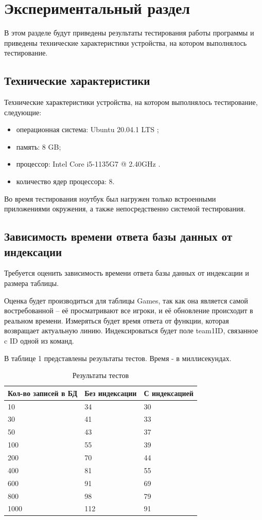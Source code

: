 \section{Экспериментальный раздел}
В этом разделе будут приведены результаты тестирования работы программы и приведены технические характеристики устройства, на котором выполнялось тестирование.

\subsection{Технические характеристики}
Технические характеристики устройства, на котором выполнялось тестирование, следующие:
\begin{itemize}
	\item операционная система: Ubuntu 20.04.1 LTS \cite{ubuntu};
	\item память: 8 GB;
	\item процессор: Intel Core i5-1135G7 @ 2.40GHz \cite{intel}.
	\item количество ядер процессора: 8.
\end{itemize}

Во время тестирования ноутбук был нагружен только встроенными приложениями окружения, а также непосредственно системой тестирования.

\subsection{Зависимость времени ответа базы данных от индексации}
Требуется оценить зависимость времени ответа базы данных от индексации и размера таблицы.

Оценка будет производиться для таблицы Games, так как она является самой востребованной -- её просматривают все игроки, и её обновление происходит в реальном времени. 
Измеряться будет время ответа от функции, которая возвращает актуальную линию. 
Индексироваться будет поле team1ID, связанное c ID одной из команд.

В таблице 1 представлены результаты тестов. Время - в миллисекундах.
\FloatBarrier
\begin{table}[h]
	\caption{Результаты тестов}
	\centering
	\begin{tabular}{ | l | l | l |}
		\hline
		Кол-во записей в БД & Без индексации & С индексацией \\ 
		\hline
		10 & 34 & 30 \\
		30 & 41 & 33 \\
		50 & 43 & 37 \\
		100 & 55 & 39 \\
		200 & 70 & 44 \\
		400 & 81 & 55 \\
		600 & 91 & 69 \\
		800 & 98 & 79 \\
		1000 & 112 & 91 \\
		\hline
	\end{tabular}
\end{table}
\FloatBarrier

